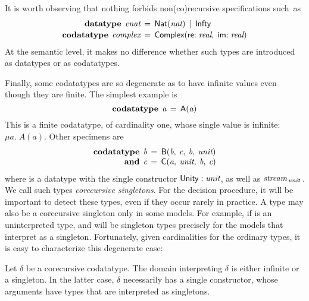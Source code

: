It is worth observing that nothing forbids non(co)recursive specifications
such~as
\[\begin{aligned}[t]
      \textbf{datatype}\;\, \textit{enat} & \,=\, \textsf{Nat}(\textit{nat}) \,\mid\, \textsf{Infty} \\[-.5\jot]
      \textbf{codatatype}\; \,\textit{complex} & \,=\, \textsf{Complex}(\textsf{re}{:}\; \textit{real},\; \textsf{im}{:}\;\textit{real})
\end{aligned}
\]
At the semantic level, it makes no difference whether such types are
introduced as datatypes or as codatatypes.

Finally, some codatatypes are so degenerate as to have infinite values
even though they are finite. The simplest example is
\[\textbf{codatatype}\;\, \textit{a} \,=\, \textsf{A}(\textit{a})\]
This is a finite codatatype, of cardinality one, whose single value is
infinite: \,$\mu a.\; A(a)$. Other specimens are
\[\begin{aligned}[t]
      \textbf{codatatype}\;\, \textit{b} & \,=\, \textsf{B}(\textit{b},\: \textit{c},\: \textit{b},\: \textit{unit}) \\[-\jot]
             \textbf{and}\;\, \textit{c} & \,=\, \textsf{C}(\textit{a},\: \textit{unit},\: \textit{b},\: \textit{c})
\end{aligned}
\]
where  is a datatype with the single constructor $\textsf{Unity} :
\textit{unit}$, as well as $\textit{stream}_{\,\textit{unit}\,}$. We call such types
\emph{corecursive singletons}. For the decision procedure, it will be
important to detect these types, even if they occur rarely in practice. A type
may also be a corecursive singleton only in some models. For example, if
 is an uninterpreted type,  and  will be singleton types
precisely for the models that interpret  as a singleton. Fortunately,
given cardinalities for the ordinary types, it is easy to characterize
this degenerate case:


\begin{lemma}%
\label{lem:corecursive-singletons}%
\afterDot
Let $\delta$ be a corecursive codatatype. The domain interpreting $\delta$ is
either infinite or a singleton. In the latter case, $\delta$ necessarily has a
single constructor, whose arguments have types that are interpreted as
singletons.
\end{lemma}


